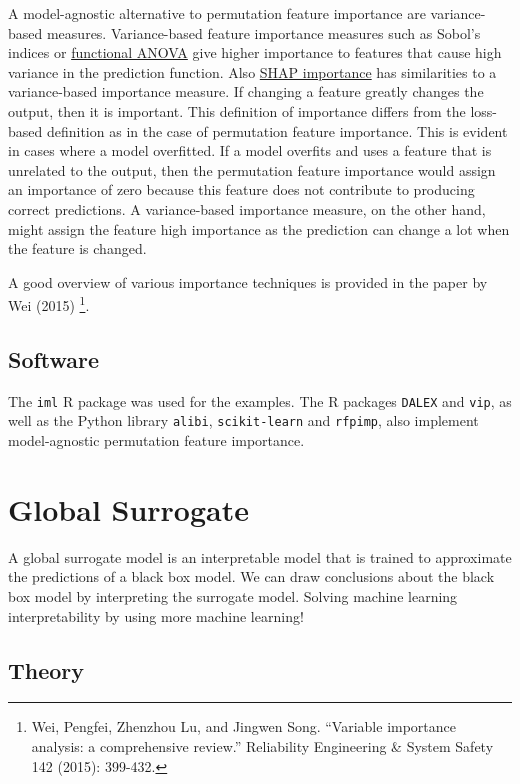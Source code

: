 \documentclass[
  11pt,
]{scrbook}
\begin{document}
A model-agnostic alternative to permutation feature importance are variance-based measures.
Variance-based feature importance measures such as Sobol's indices or \protect\hyperlink{decomposition}{functional ANOVA} give higher importance to features that cause high variance in the prediction function.
Also \protect\hyperlink{shap}{SHAP importance} has similarities to a variance-based importance measure.
If changing a feature greatly changes the output, then it is important.
This definition of importance differs from the loss-based definition as in the case of permutation feature importance.
This is evident in cases where a model overfitted.
If a model overfits and uses a feature that is unrelated to the output, then the permutation feature importance would assign an importance of zero because this feature does not contribute to producing correct predictions.
A variance-based importance measure, on the other hand, might assign the feature high importance as the prediction can change a lot when the feature is changed.

A good overview of various importance techniques is provided in the paper by Wei (2015) \footnote{Wei, Pengfei, Zhenzhou Lu, and Jingwen Song. ``Variable importance analysis: a comprehensive review.'' Reliability Engineering \& System Safety 142 (2015): 399-432.}.

\hypertarget{software-3}{%
\subsection{Software}\label{software-3}}

The \texttt{iml} R package was used for the examples.
The R packages \texttt{DALEX} and \texttt{vip}, as well as the Python library \texttt{alibi}, \texttt{scikit-learn} and \texttt{rfpimp}, also implement model-agnostic permutation feature importance.

\newpage

\hypertarget{global}{%
\section{Global Surrogate}\label{global}}

A global surrogate model is an interpretable model that is trained to approximate the predictions of a black box model.
We can draw conclusions about the black box model by interpreting the surrogate model.
Solving machine learning interpretability by using more machine learning!

\hypertarget{theory-4}{%
\subsection{Theory}\label{theory-4}}
\end{document}
